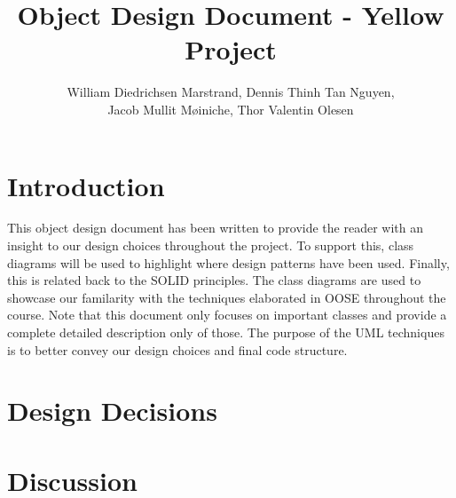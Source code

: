 \documentclass{article}
\title{Object Design Document - Yellow Project}
\author{William Diedrichsen Marstrand, Dennis Thinh Tan Nguyen, 
\\Jacob Mullit M{\o}iniche, Thor Valentin Olesen}
\begin{document}
\maketitle
\newpage
\tableofcontents
\newpage

\section{Introduction}

This object design document has been written to provide the reader with an insight to our design choices throughout the project. To support this, class diagrams will be used to highlight where design patterns have been used. Finally, this is related back to the SOLID principles. The class diagrams are used to showcase our familarity with the techniques elaborated in OOSE throughout the course. Note that this document only focuses on important classes and provide a complete detailed description only of those. The purpose of the UML techniques is to better convey our design choices and final code structure. 



\section{Design Decisions}
	
\section{Discussion} %
\end{document}
